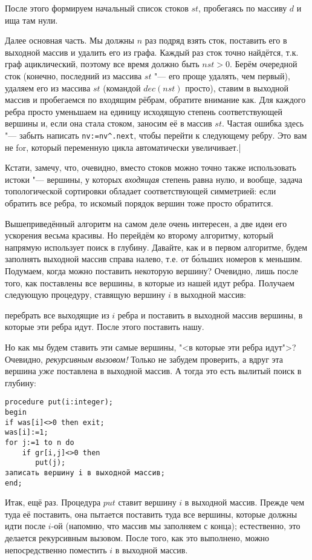 После этого формируем начальный список стоков $st$, пробегаясь по массиву $d$ и ища там нули. 

Далее основная часть. Мы должны $n$ раз подряд взять сток, поставить его в выходной массив и удалить его из графа.
Каждый раз сток точно найдётся, т.к. граф ациклический, поэтому все время должно быть $nst>0$. Берём очередной сток
(конечно, последний из массива $st$ "--- его проще удалять, чем первый), удаляем его из массива $st$ (командой
$dec(nst)$ просто), ставим в выходной массив и пробегаемся по входящим рёбрам, обратите внимание как. Для каждого
ребра просто уменьшаем на единицу исходящую степень соответствующей вершины и, если она стала стоком, заносим её
в массив $st$. Частая ошибка здесь "--- забыть написать \verb'nv:=nv^.next', чтобы перейти к следующему ребру. Это вам не
for, который переменную цикла автоматически увеличивает.|\label{Knuthalgorithm}

Кстати, замечу, что, очевидно, вместо стоков можно точно также использовать истоки "--- вершины, у 
которых \textit{входящая} степень равна нулю, и вообще, задача топологической сортировки обладает 
соответствующей симметрией: если обратить все ребра, то искомый порядок вершин тоже просто 
обратится.

Вышеприведённый алгоритм на самом деле очень интересен, а две идеи его ускорения весьма красивы. Но 
перейдём ко второму алгоритму, который напрямую использует поиск в глубину. Давайте, как и в первом 
алгоритме, будем заполнять выходной массив справа налево, т.е. от б\'{о}льших номеров к меньшим. 
Подумаем, когда можно поставить некоторую вершину? Очевидно, лишь после того, как поставлены все 
вершины, в которые из нашей идут ребра. Получаем следующую процедуру, ставящую вершину $i$ в 
выходной массив: 
\begin{center}
перебрать все выходящие из $i$ ребра и поставить в выходной массив вершины, в 
которые эти ребра идут. После этого поставить нашу. 
\end{center}
Но как мы будем ставить эти самые вершины, "<в которые эти ребра идут">? Очевидно, 
\textit{рекурсивным вызовом!} Только не забудем проверить, а вдруг эта вершина \textit{уже} поставлена в 
выходной массив. А тогда это есть вылитый поиск в глубину:
\begin{codesampleo}\begin{verbatim}
procedure put(i:integer);
begin
if was[i]<>0 then exit;
was[i]:=1;
for j:=1 to n do
    if gr[i,j]<>0 then
       put(j);
записать вершину i в выходной массив;
end;
\end{verbatim}
\end{codesampleo}
Итак, ещё раз. Процедура $put$ ставит вершину $i$ в выходной массив. Прежде чем туда её поставить, 
она пытается поставить туда все вершины, которые должны идти после $i$-ой (напомню, что массив мы 
заполняем с конца); естественно, это делается рекурсивным вызовом. После того, как это выполнено, 
можно непосредственно поместить $i$ в выходной массив.

